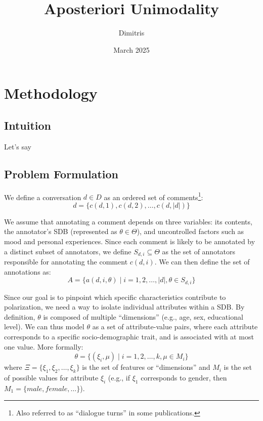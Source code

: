 \documentclass{article}
\title{Aposteriori Unimodality}
\author{Dimitris }
\date{March 2025}
\begin{document}
\maketitle

\section{Methodology}

\subsection{Intuition}

Let's say 


\subsection{Problem Formulation}
\label{ssec:methodology:problem}

We define a conversation $d \in D$ as an ordered set of comments\footnote{Also referred to as “dialogue turns” in some publications.}:
\begin{equation}
    d = \{c(d, 1), c(d, 2), \ldots, c(d, \lvert d \rvert)\}
\end{equation}

We assume that annotating a comment depends on three variables: its contents, the annotator's \ac{SDB} (represented as $\theta \in \Theta$), and uncontrolled factors such as mood and personal experiences. Since each comment is likely to be annotated by a distinct subset of annotators, we define $S_{d, i} \subseteq \Theta$ as the set of annotators responsible for annotating the comment $c(d, i)$. We can then define the set of annotations as:
\begin{equation}
    A = \{a(d, i, \theta) \mid i=1, 2, \ldots, \lvert d \rvert, \theta \in S_{d, i} \}
\end{equation}

Since our goal is to pinpoint which specific characteristics contribute to polarization, we need a way to isolate individual attributes within a \ac{SDB}. By definition, $\theta$ is composed of multiple ``dimensions'' (e.g., age, sex, educational level). We can thus model $\theta$ as a set of attribute-value pairs, where each attribute corresponds to a specific socio-demographic trait, and is associated  with at most one value. More formally:
\begin{equation}
    \theta = \{(\xi_i, \mu) \mid i=1, 2, \ldots, k \mathpunct{,} \mu \in M_i\}
\end{equation} 
\noindent where $\Xi=\{\xi_1, \xi_2, \ldots, \xi_k\}$ is the set of features or ``dimensions'' and $M_i$ is the set of possible values for attribute $\xi_i$ (e.g., if $\xi_1$ corresponds to gender, then $M_1=\{\textit{male}, \textit{female}, \ldots\}$).
\end{document}
